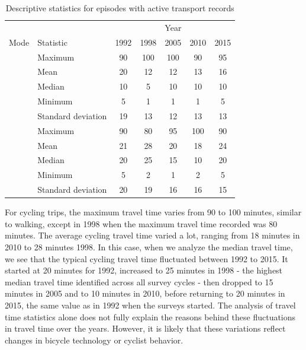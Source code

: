 \documentclass[preprint, 3p,
authoryear]{elsarticle} %
\begin{document}
\begin{longtable}[t]{>{}llccccc}
\caption{\label{tab:table-02}\label{tab:table-02}Descriptive statistics for episodes with active transport records}\\
\toprule
\multicolumn{2}{c}{ } & \multicolumn{5}{c}{Year} \\
\cmidrule(l{3pt}r{3pt}){3-7}
Mode & Statistic & 1992 & 1998 & 2005 & 2010 & 2015\\
\midrule
 & Maximum & 90 & 100 & 100 & 90 & 95\\
\nopagebreak
 & Mean & 20 & 12 & 12 & 13 & 16\\
\nopagebreak
 & Median & 10 & 5 & 10 & 10 & 10\\
\nopagebreak
 & Minimum & 5 & 1 & 1 & 1 & 5\\
\nopagebreak
\multirow[t]{-5}{*}{\raggedright\arraybackslash \textbf{Walking}} & Standard deviation & 19 & 13 & 12 & 13 & 13\\
\cmidrule{1-7}\pagebreak[0]
 & Maximum & 90 & 80 & 95 & 100 & 90\\
\nopagebreak
 & Mean & 21 & 28 & 20 & 18 & 24\\
\nopagebreak
 & Median & 20 & 25 & 15 & 10 & 20\\
\nopagebreak
 & Minimum & 5 & 2 & 1 & 2 & 5\\
\nopagebreak
\multirow[t]{-5}{*}{\raggedright\arraybackslash \textbf{Cycling}} & Standard deviation & 20 & 19 & 16 & 16 & 15\\
\bottomrule
\end{longtable}
\endgroup{}

For cycling trips, the maximum travel time varies from 90 to 100
minutes, similar to walking, except in 1998 when the maximum travel time
recorded was 80 minutes. The average cycling travel time varied a lot,
ranging from 18 minutes in 2010 to 28 minutes 1998. In this case, when
we analyze the median travel time, we see that the typical cycling
travel time fluctuated between 1992 to 2015. It started at 20 minutes
for 1992, increased to 25 minutes in 1998 - the highest median travel
time identified across all survey cycles - then dropped to 15 minutes in
2005 and to 10 minutes in 2010, before returning to 20 minutes in 2015,
the same value as in 1992 when the surveys started. The analysis of
travel time statistics alone does not fully explain the reasons behind
these fluctuations in travel time over the years. However, it is likely
that these variations reflect changes in bicycle technology or cyclist
behavior.
\end{document}
